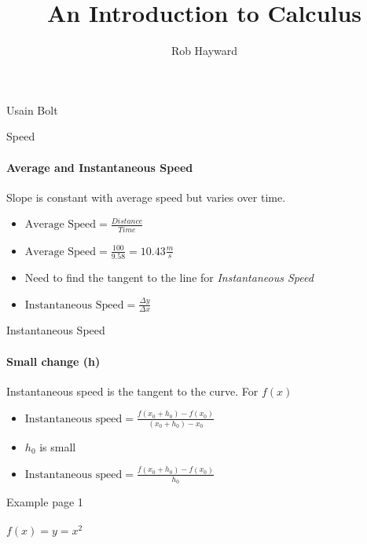\documentclass[14pt,xcolor=pdftex,dvipsnames,table]{beamer}
\title{An Introduction to Calculus}
\author{Rob Hayward}
\date{}
\begin{document}
\begin{frame}
\titlepage
\end{frame}


\begin{frame}{Usain Bolt}
\end{frame}

\begin{frame}{Speed}
\framesubtitle{Average and Instantaneous Speed}
Slope is constant with average speed but varies over time.
\pause
\begin{itemize}[<+-| alert@+>]
\item $\text{Average Speed} = \frac{Distance}{Time}$
\item $\text{Average Speed} = \frac{100}{9.58} = 10.43\frac{m}{s}$
\item Need to find the tangent to the line for \emph{Instantaneous Speed}
\item $\text{Instantaneous Speed} = \frac{\Delta y}{\Delta x}$
\end{itemize}
\end{frame}

\begin{frame}{Instantaneous Speed}
\framesubtitle{Small change (h)}
Instantaneous speed is the tangent to the curve.  For $f(x)$
\pause
\begin{itemize}[<+-| alert@+>]
\item $\text{Instantaneous speed} = \frac{f(x_0 + h_0) - f(x_0)}{(x_0 +h_0) - 
x_0}$ 
\item $h_0$ is small
\item $\text{Instantaneous speed} = \frac{f(x_0 + h_0) - f(x_0)}{h_0}$
\end{itemize}
\end{frame}

\begin{frame}{Example page 1}
\framesubtitle{$f(x) = y = x^2$}

\end{frame}
\end{document}
